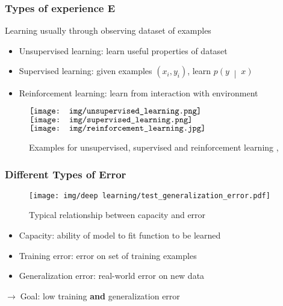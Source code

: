 \documentclass{beamer}
\newcommand{\arrow}{$\rightarrow\;$}
\renewcommand{\c}[2]{\left(#1\;\middle|\;#2\right)}
\begin{document}
\begin{frame}
    \frametitle{Types of experience E}
    Learning usually through observing dataset of examples 
    \begin{itemize}
        \item Unsupervised learning: learn useful properties of dataset
        \item Supervised learning: given examples $(x_i, y_i)$, learn $p\c{y}{x}$
        \item Reinforcement learning: learn from interaction with environment
    \end{itemize}
    
    \begin{figure}
        \hspace{-2em}
        $\vcenter{\hbox{\texttt{[image: img/unsupervised\_learning.png]}}}$
        $\vcenter{\hbox{\texttt{[image: img/supervised\_learning.png]}}}$
        $\vcenter{\hbox{\texttt{[image: img/reinforcement\_learning.jpg]}}}$
        \hspace{-2em}
        \caption{Examples for unsupervised, supervised and reinforcement learning \cite{unsupervised}, \cite{supervised} \cite{reinforcement}}
    \end{figure}
\end{frame}

\begin{frame}
    \frametitle{Different Types of Error}
    \begin{figure}
        \texttt{[image: img/deep learning/test\_generalization\_error.pdf]}
        \caption{Typical relationship between capacity and error \cite{textbook}}
    \end{figure}
    
    \begin{itemize}
        \item Capacity: ability of model to fit function to be learned
        \item Training error: error on set of training examples
        \item Generalization error: real-world error on new data
    \end{itemize}
    \arrow Goal: low training \textbf{and} generalization error
\end{frame}
\end{document}
